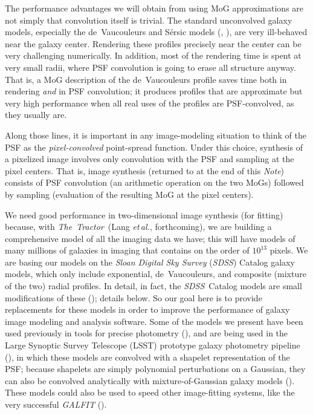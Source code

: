 \documentclass[12pt,pdftex,preprint]{aastex}
\newcommand{\foreign}[1]{\textit{#1}}
\newcommand{\etal}{\foreign{et\,al.}}
\newcommand{\documentname}{\textsl{Note}}
\newcommand{\project}[1]{\textsl{#1}}
\newcommand{\thetractor}{\project{The~Tractor}}
\newcommand{\sdss}{\project{SDSS}}
\begin{document}
The performance advantages we will obtain from using MoG
approximations are not simply that convolution itself is trivial.  The
standard unconvolved galaxy models, especially the de~Vaucouleurs and
S\'ersic models (\citealt{dev}, \citealt{ser}), are very ill-behaved
near the galaxy center.  Rendering these profiles precisely near the
center can be very challenging numerically.  In addition, most of the
rendering time is spent at very small radii, where PSF convolution is
going to erase all structure anyway.  That is, a MoG description of
the de~Vaucouleurs profile saves time both in rendering \emph{and} in
PSF convolution; it produces profiles that are approximate but very
high performance when all real uses of the profiles are PSF-convolved,
as they usually are.

Along those lines, it is important in any image-modeling situation to
think of the PSF as the \emph{pixel-convolved} point-spread function.
Under this choice, synthesis of a pixelized image involves only
convolution with the PSF and sampling at the pixel centers.  That is,
image synthesis (returned to at the end of this \documentname)
consists of PSF convolution (an arithmetic operation on the two MoGs)
followed by sampling (evaluation of the resulting MoG at the pixel
centers).

We need good performance in two-dimensional image synthesis (for
fitting) because, with \thetractor\ (Lang \etal, forthcoming), we are
building a comprehensive model of all the imaging data we have; this
will have models of many millions of galaxies in imaging that contains
on the order of $10^{13}$ pixels.  We are basing our models on the
\project{Sloan Digital Sky Survey} (\sdss) Catalog galaxy models,
which only include exponential, de~Vaucouleurs, and composite (mixture
of the two) radial profiles.  In detail, in fact, the \sdss\ Catalog
models are small modifications of these (\citealt{lupton}); details
below.  So our goal here is to provide replacements for these models
in order to improve the performance of galaxy image modeling and
analysis software.  Some of the models we present have been used
previously in tools for precise photometry (\citealt{bundy}), and are
being used in the Large Synoptic Survey Telescope (LSST) prototype
galaxy photometry pipeline (\citealt{shaw}), in which these models are
convolved with a shapelet representation of the PSF; because shapelets
are simply polynomial perturbations on a Gaussian, they can also be
convolved analytically with mixture-of-Gaussian galaxy models
(\citealt{bosch}).  These models could also be used to speed other
image-fitting systems, like the very successful \project{GALFIT}
(\citealt{galfit}).
\end{document}
